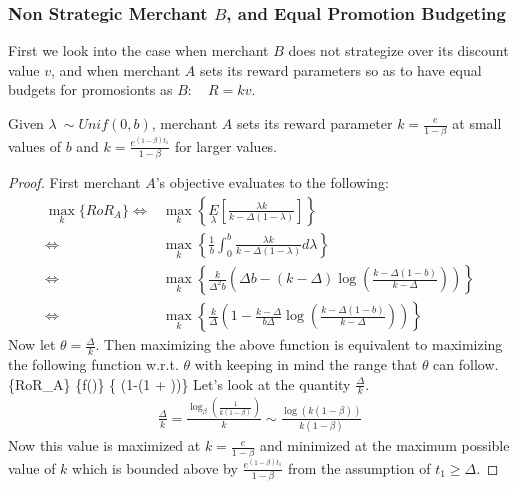 \subsubsection{Non Strategic Merchant $B$, and Equal Promotion Budgeting}
First we look into the case when merchant $B$ does not strategize over its discount value $v$, and when merchant $A$ sets its reward parameters so as to have equal budgets for promosionts as $B$: \ie~ $R = k v$.
\begin{theorem}
Given $\lambda~\sim Unif(0,b)$, merchant $A$ sets its reward parameter $k = \frac{e}{1-\beta}$ at small values of $b$ and $k = \frac{e^{(1-\beta)t_1}}{1-\beta}$ for larger values.
\end{theorem}
\begin{proof}
First merchant $A$'s objective evaluates to the following:
\begin{align*}
\underset{k}\max\{RoR_A\} \Leftrightarrow & \underset{k}\max\left\{\underset{\lambda}E\left[\frac{\lambda k}{k-\Delta(1-\lambda)}\right]\right\}\\
                          \Leftrightarrow & \underset{k}\max\left\{ \frac{1}{b}\int_{0}^{b} \frac{\lambda k}{k-\Delta(1-\lambda)}d\lambda \right\}\\
                          \Leftrightarrow & \underset{k}\max\left\{ \frac{k}{\Delta^2 b}\left(\Delta b - (k-\Delta)\log\left(\frac{k-\Delta(1-b)}{k-\Delta}\right)\right) \right\}\\
                          \Leftrightarrow & \underset{k} \max\left\{\frac{k}{\Delta}\left(1-\frac{k-\Delta}{b\Delta}\log\left(\frac{k-\Delta(1-b)}{k-\Delta}\right)\right)\right\}
\end{align*}
Now let $\theta = \frac{\Delta}{k}$. Then maximizing the above function is equivalent to maximizing the following function w.r.t. $\theta$ with keeping in mind the range that $\theta$ can follow.
\beq
{}\max\{RoR_A\} \Leftrightarrow \underset{\theta}\max\{f(\theta)\} \Leftrightarrow \underset{\theta}\max\left\{  \left(1-\log\left(1 + \right)\right)\right\} 
\eeq
Let's look at the quantity $\frac{\Delta}{k}$.
\begin{align*}
\frac{\Delta}{k} = \frac{\log_\beta\left(\frac{1}{k(1-\beta)}\right)}{k} \sim \frac{\log(k(1-\beta))}{k(1-\beta)} 
\end{align*}
Now this value is maximized at $k = \frac{e}{1-\beta}$ and minimized at the maximum possible value of $k$ which is bounded above by $\frac{e^{(1-\beta)t_1}}{1-\beta}$ from the assumption of $t_1 \ge \Delta$.


\end{proof}
